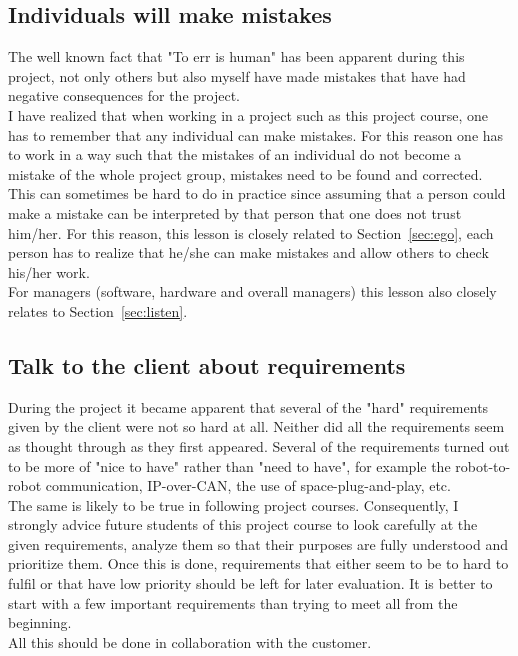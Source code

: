 \subsection{Individuals will make mistakes}
The well known fact that "To err is human" has been apparent during this project, not only others but also myself have made mistakes that have had negative consequences for the project. \\ %
I have realized that when working in a project such as this project course, one has to remember that any individual can make mistakes. For this reason one has to work in a way such that the mistakes of an individual do not become a mistake of the whole project group, mistakes need to be found and corrected. This can sometimes be hard to do in practice since assuming that a person could make a mistake can be interpreted by that person that one does not trust him/her. For this reason, this lesson is closely related to Section~\ref{sec:ego}, each person has to realize that he/she can make mistakes and allow others to check his/her work. \\
For managers (software, hardware and overall managers) this lesson also closely relates to Section~\ref{sec:listen}.


\subsection{Talk to the client about requirements}\label{sec:client}
During the project it became apparent that several of the "hard" requirements given by the client were not so hard at all. Neither did all the requirements seem as thought through as they first appeared. Several of the requirements turned out to be more of "nice to have" rather than "need to have", for example the robot-to-robot communication, IP-over-CAN, the use of space-plug-and-play, etc. \\

The same is likely to be true in following project courses. Consequently, I strongly advice future students of this project course to look carefully at the given requirements, analyze them so that their purposes are fully understood and prioritize them. Once this is done, requirements that either seem to be to hard to fulfil or that have low priority should be left for later evaluation. It is better to start with a few important requirements than trying to meet all from the beginning. \\
All this should be done in collaboration with the customer.

